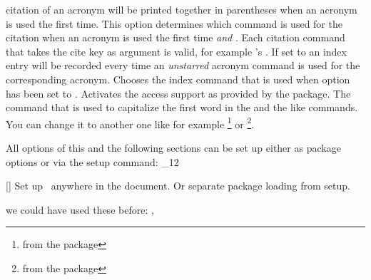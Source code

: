 \documentclass[load-preamble+,scrartcl={DIV10}]{cnltx-doc}
\makeatletter
\renewenvironment{commands}
  {%
    \cnltx@set@catcode_{12}%
    \let\command\cnltx@command
    \cnltxlist
  }
  {\endcnltxlist}
\makeatother
\begin{document}
\begin{options}
    citation of an acronym will be printed together in parentheses when an
    acronym is used the first time.
    This option determines which command is used for the
    citation when an acronym is used the first time \emph{and}
    .  Each citation command that takes the cite
    key as argument is valid, for example 's .
    If set to  an index entry will be recorded
    every time an \emph{unstarred} acronym command is used for the
    corresponding acronym.
    Chooses the index command that is used when option
     has been set to .
    Activates the access support as provided by the
     package.
    The command that is used to capitalize the first word in the  and
    the like commands.  You can change it to another one like for example
    \footnote{from the  package} or
    \footnote{from the  package}.
\end{options}
 
All options of this and the following sections can be set up either as package
options or via the setup command:
\begin{commands}
  \command{acsetup}[]
   Set up \acro\ anywhere in the document.  Or separate package loading from
   setup.
\end{commands}

\begin{example}
  we could have used these before: \nato, \ny
\end{example}
\end{document}

